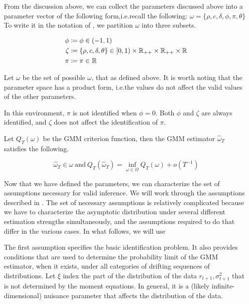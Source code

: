 \documentclass[11pt, letterpaper, twoside, final]{article}
\begin{document}
From the discussion above, we can collect the parameters discussed above into a parameter vector of the following form,i.e.\@ recall the following: $\omega = \lbrace \rho, c, \delta, \phi, \pi, \theta \rbrace$ To write it in the notation of \textcite{andrews2014Gmm}, we partition $\omega$ into three subsets.

\begin{align}
  \phi &\coloneqq \phi \in (-1, 1) \\ 
  \zeta &\coloneqq \lbrace \rho, c, \delta, \theta \rbrace \in [0,1) \times \mathbb{R}_{++} \times \mathbb{R}_{++} \times
  \mathbb{R} \\
  \pi &\coloneqq \pi \in \mathbb{R}
\end{align}

Let $\omega$ be the set of possible $\omega$, that as defined above. It is worth noting that the parameter space has a product form, i.e.\@ the values do not affect the valid values of the other parameters.

In this environment, $\pi$ is not identified when $\phi = 0$.
Both $\phi$ and $\zeta$ are always identified, and $\zeta$ does not affect the identification of $\pi$.

Let $Q_T(\omega)$ be the GMM criterion function, then the GMM estimator $\hat{\omega}_T$ satisfies the following.


\begin{equation}
  \widehat{\omega}_T \in \omega\ \text{and}\ Q_T(\hat{\omega}_T) = \inf_{\omega \in \Omega} Q_T(\omega) +
  o\left(T^{-1}\right) 
\end{equation}


Now that we have defined the parameters, we can characterize the set of assumptions necessary for valid inference. We will work through the assumptions described in \textcite{andrews2014Gmm}. The set of necessary assumptions is relatively complicated because we have to characterize the asymptotic distribution under several different estimation strengths simultaneously, and the assumptions required to do that  differ in the various cases.  In what follows, we will use 

The first assumption specifies the basic identification problem. It also provides conditions that are used to determine the probability limit of the GMM estimator, when it exists, under all categories of drifting sequences of distributions. Let $\xi$ index the part of the distribution of the data $r_{t+1}, \sigma^2_{t+1}$ that is not determined by the moment equations. In general, it is a (likely infinite-dimensional) nuisance parameter that affects the distribution of the data. 
\end{document}
